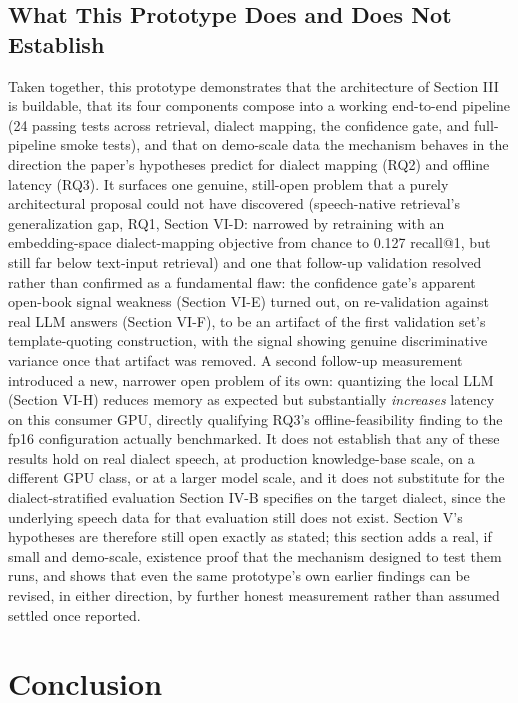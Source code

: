 \documentclass[conference]{IEEEtran}
\begin{document}
\subsection{What This Prototype Does and Does Not Establish}
Taken together, this prototype demonstrates that the architecture of Section III is buildable, that its four components compose into a working end-to-end pipeline (24 passing tests across retrieval, dialect mapping, the confidence gate, and full-pipeline smoke tests), and that on demo-scale data the mechanism behaves in the direction the paper's hypotheses predict for dialect mapping (RQ2) and offline latency (RQ3). It surfaces one genuine, still-open problem that a purely architectural proposal could not have discovered (speech-native retrieval's generalization gap, RQ1, Section VI-D: narrowed by retraining with an embedding-space dialect-mapping objective from chance to 0.127 recall@1, but still far below text-input retrieval) and one that follow-up validation resolved rather than confirmed as a fundamental flaw: the confidence gate's apparent open-book signal weakness (Section VI-E) turned out, on re-validation against real LLM answers (Section VI-F), to be an artifact of the first validation set's template-quoting construction, with the signal showing genuine discriminative variance once that artifact was removed. A second follow-up measurement introduced a new, narrower open problem of its own: quantizing the local LLM (Section VI-H) reduces memory as expected but substantially \emph{increases} latency on this consumer GPU, directly qualifying RQ3's offline-feasibility finding to the fp16 configuration actually benchmarked. It does not establish that any of these results hold on real dialect speech, at production knowledge-base scale, on a different GPU class, or at a larger model scale, and it does not substitute for the dialect-stratified evaluation Section IV-B specifies on the target dialect, since the underlying speech data for that evaluation still does not exist. Section V's hypotheses are therefore still open exactly as stated; this section adds a real, if small and demo-scale, existence proof that the mechanism designed to test them runs, and shows that even the same prototype's own earlier findings can be revised, in either direction, by further honest measurement rather than assumed settled once reported.

\section{Conclusion}
\end{document}
